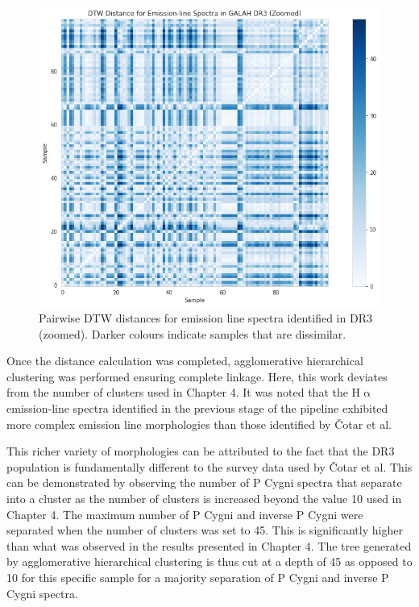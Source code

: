 \begin{figure}[!htb]
\centering
\includegraphics[scale=0.50]{figures/dtw distances dr3 zoomed.png}
\caption{Pairwise DTW distances for emission line spectra identified in DR3 (zoomed). Darker colours indicate samples that are dissimilar.}
\end{figure}

Once the distance calculation was completed, agglomerative hierarchical clustering was performed ensuring complete linkage. Here, this work deviates from the number of clusters used in Chapter 4. It was noted that the H$\upalpha$ emission-line spectra identified in the previous stage of the pipeline exhibited more complex emission line morphologies than those identified by Čotar et al. 

This richer variety of morphologies can be attributed to the fact that the DR3 population is fundamentally different to the survey data used by Čotar et al. This can be demonstrated by observing the number of P Cygni spectra that separate into a cluster as the number of clusters is increased beyond the value 10 used in Chapter 4. The maximum number of P Cygni and inverse P Cygni were separated when the number of clusters was set to 45. This is significantly higher than what was observed in the results presented in Chapter 4. The tree generated by agglomerative hierarchical clustering is thus cut at a depth of 45 as opposed to 10 for this specific sample for a majority separation of P Cygni and inverse P Cygni spectra. 

